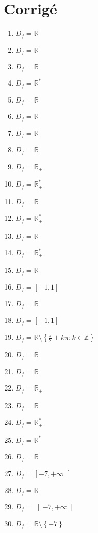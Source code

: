 \documentclass[a4paper,12pt]{article}
\newcommand{\minuss}[1]{\setminus\left\{#1\right\}}
\newcommand{\intoo}[1]{\left\rbrack#1\right\lbrack}
\newcommand{\intfo}[1]{\left\lbrack#1\right\lbrack}
\newcommand{\intff}[1]{\left\lbrack#1\right\rbrack}
\begin{document}
\begin{multicols}{2}
\begin{enumerate}
\end{enumerate}
\end{multicols}
\clearpage
\section{Corrig\'e}\label{corrige} 
\begin{multicols}{2}
\begin{enumerate}
\item $D_f=\mathbb{R}$
\item $D_f=\mathbb{R}$
\item $D_f=\mathbb{R}$
\item $D_f=\mathbb{R^*}$
\item $D_f=\mathbb{R}$
\item $D_f=\mathbb{R}$
\item $D_f=\mathbb{R}$
\item $D_f=\mathbb{R}$
\item $D_f=\mathbb{R_+}$
\item $D_f=\mathbb{R_+^*}$
\item $D_f=\mathbb{R}$
\item $D_f=\mathbb{R_+^*}$
\item $D_f=\mathbb{R}$
\item $D_f=\mathbb{R_+^*}$
\item $D_f=\mathbb{R}$
\item $D_f=\intff{-1,1}$
\item $D_f=\mathbb{R}$
\item $D_f=\intff{-1,1}$
\item $D_f=\mathbb{R}\minuss{\frac{\pi}{2}+k\pi : k\in\mathbb{Z}}$
\item $D_f=\mathbb{R}$
\item $D_f=\mathbb{R}$
\item $D_f=\mathbb{R_+}$
\item $D_f=\mathbb{R}$
\item $D_f=\mathbb{R_+^*}$
\item $D_f=\mathbb{R^*}$
\item $D_f=\mathbb{R}$
\item $D_f=\intfo{-7,+\infty}$
\item $D_f=\mathbb{R}$
\item $D_f=\intoo{-7,+\infty}$
\item $D_f=\mathbb{R}\minuss{-7}$

\end{enumerate}
\end{multicols}
\end{document}
